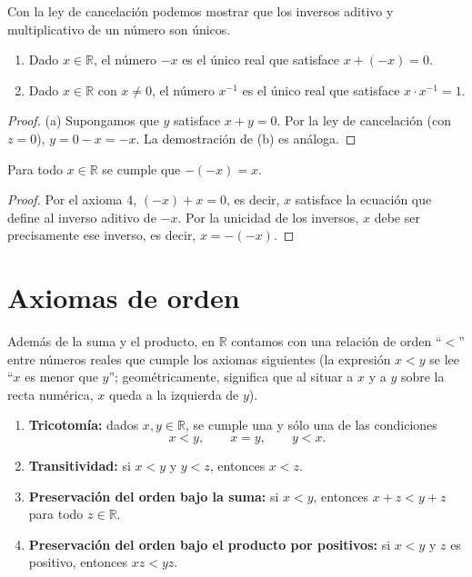 \documentclass[12pt,a4paper]{book}
\begin{document}
  Con la ley de cancelación podemos mostrar que los inversos aditivo y multiplicativo de un número son únicos.
  
  \begin{proposicion}
    \begin{enumerate}[label=(\alph*)]
      \item Dado $x \in \mathbb{R}$, el número $-x$ es el único real que satisface $x+(-x)=0$.
      \item Dado $x \in \mathbb{R}$ con $x \neq 0$, el número $x^{-1}$ es el único real que satisface $x \cdot x^{-1}=1$.
    \end{enumerate}
  \end{proposicion}
  
  \begin{proof}
    (a) Supongamos que $y$ satisface $x+y=0$. Por la ley de cancelación (con $z=0$), $y=0-x=-x$. La demostración de (b) es análoga.
  \end{proof}
  
  \begin{corolario}
    Para todo $x \in \mathbb{R}$ se cumple que $-(-x)=x$.
  \end{corolario}
  
  \begin{proof}
    Por el axioma 4, $(-x)+x=0$, es decir, $x$ satisface la ecuación que define al inverso aditivo de $-x$. Por la unicidad de los inversos, $x$ debe ser precisamente ese inverso, es decir, $x=-(-x)$.
  \end{proof}
  
  \section{Axiomas de orden}
  
  Además de la suma y el producto, en $\mathbb{R}$ contamos con una relación de orden ``$<$'' entre números reales que cumple los axiomas siguientes (la expresión $x<y$ se lee ``$x$ es menor que $y$''; geométricamente, significa que al situar a $x$ y a $y$ sobre la recta numérica, $x$ queda a la izquierda de $y$).
  
  \begin{enumerate}[leftmargin=2.6em]
    \item[\textbf{10.}] \textbf{Tricotomía:} dados $x,y \in \mathbb{R}$, se cumple una y sólo una de las condiciones
          \begin{equation*}
            x<y, \qquad x=y, \qquad y<x.
          \end{equation*}
    \item[\textbf{11.}] \textbf{Transitividad:} si $x<y$ y $y<z$, entonces $x<z$.
    \item[\textbf{12.}] \textbf{Preservación del orden bajo la suma:} si $x<y$, entonces $x+z<y+z$ para todo $z \in \mathbb{R}$.
    \item[\textbf{13.}] \textbf{Preservación del orden bajo el producto por positivos:} si $x<y$ y $z$ es positivo, entonces $xz<yz$.
  \end{enumerate}
  
\end{document}
